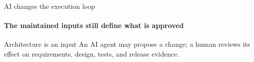 \begin{frame}{AI changes the execution loop}
\framesubtitle{The maintained inputs still define what is approved}
\centering
\resizebox{10.6cm}{!}{}
\vspace{0.22cm}
\begin{slidecallout}{Architecture is an input}
An AI agent may propose a change; a human reviews its effect on requirements, design, tests, and release evidence.
\end{slidecallout}
\end{frame}
